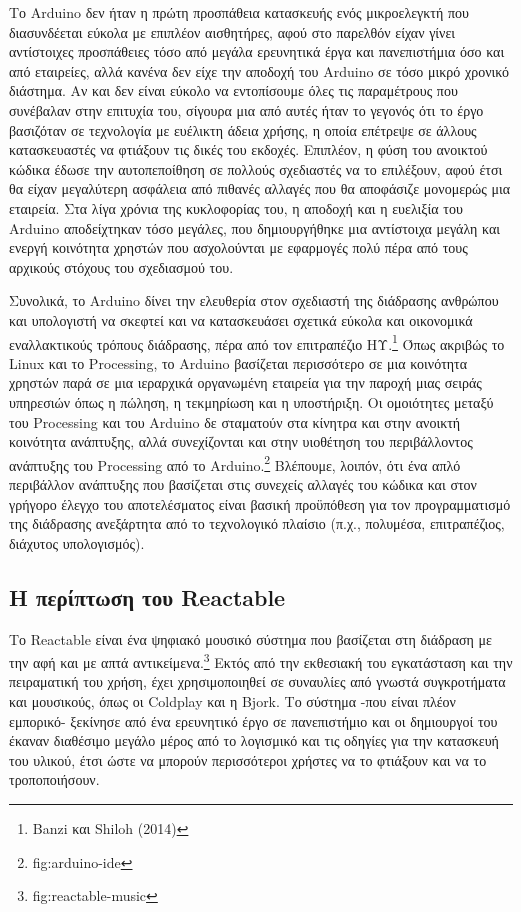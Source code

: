 \documentclass[
]{article}
\begin{document}
Το Arduino δεν ήταν η πρώτη προσπάθεια κατασκευής ενός μικροελεγκτή που
διασυνδέεται εύκολα με επιπλέον αισθητήρες, αφού στο παρελθόν είχαν
γίνει αντίστοιχες προσπάθειες τόσο από μεγάλα ερευνητικά έργα και
πανεπιστήμια όσο και από εταιρείες, αλλά κανένα δεν είχε την αποδοχή του
Arduino σε τόσο μικρό χρονικό διάστημα. Αν και δεν είναι εύκολο να
εντοπίσουμε όλες τις παραμέτρους που συνέβαλαν στην επιτυχία του,
σίγουρα μια από αυτές ήταν το γεγονός ότι το έργο βασιζόταν σε
τεχνολογία με ευέλικτη άδεια χρήσης, η οποία επέτρεψε σε άλλους
κατασκευαστές να φτιάξουν τις δικές του εκδοχές. Επιπλέον, η φύση του
ανοικτού κώδικα έδωσε την αυτοπεποίθηση σε πολλούς σχεδιαστές να το
επιλέξουν, αφού έτσι θα είχαν μεγαλύτερη ασφάλεια από πιθανές αλλαγές
που θα αποφάσιζε μονομερώς μια εταιρεία. Στα λίγα χρόνια της κυκλοφορίας
του, η αποδοχή και η ευελιξία του Arduino αποδείχτηκαν τόσο μεγάλες, που
δημιουργήθηκε μια αντίστοιχα μεγάλη και ενεργή κοινότητα χρηστών που
ασχολούνται με εφαρμογές πολύ πέρα από τους αρχικούς στόχους του
σχεδιασμού του.

Συνολικά, το Arduino δίνει την ελευθερία στον σχεδιαστή της διάδρασης
ανθρώπου και υπολογιστή να σκεφτεί και να κατασκευάσει σχετικά εύκολα
και οικονομικά εναλλακτικούς τρόπους διάδρασης, πέρα από τον επιτραπέζιο
ΗΥ.\footnote{Banzi και Shiloh (2014)} Όπως ακριβώς το Linux και το
Processing, το Arduino βασίζεται περισσότερο σε μια κοινότητα χρηστών
παρά σε μια ιεραρχικά οργανωμένη εταιρεία για την παροχή μιας σειράς
υπηρεσιών όπως η πώληση, η τεκμηρίωση και η υποστήριξη. Οι ομοιότητες
μεταξύ του Processing και του Arduino δε σταματούν στα κίνητρα και στην
ανοικτή κοινότητα ανάπτυξης, αλλά συνεχίζονται και στην υιοθέτηση του
περιβάλλοντος ανάπτυξης του Processing από το Arduino.\footnote{fig:arduino-ide}
Βλέπουμε, λοιπόν, ότι ένα απλό περιβάλλον ανάπτυξης που βασίζεται στις
συνεχείς αλλαγές του κώδικα και στον γρήγορο έλεγχο του αποτελέσματος
είναι βασική προϋπόθεση για τον προγραμματισμό της διάδρασης ανεξάρτητα
από το τεχνολογικό πλαίσιο (π.χ., πολυμέσα, επιτραπέζιος, διάχυτος
υπολογισμός).

\hypertarget{ux3b7-ux3c0ux3b5ux3c1ux3afux3c0ux3c4ux3c9ux3c3ux3b7-ux3c4ux3bfux3c5-reactable}{%
\subsection{Η περίπτωση του
Reactable}\label{ux3b7-ux3c0ux3b5ux3c1ux3afux3c0ux3c4ux3c9ux3c3ux3b7-ux3c4ux3bfux3c5-reactable}}

Το Reactable είναι ένα ψηφιακό μουσικό σύστημα που βασίζεται στη
διάδραση με την αφή και με απτά αντικείμενα.\footnote{fig:reactable-music}
Εκτός από την εκθεσιακή του εγκατάσταση και την πειραματική του χρήση,
έχει χρησιμοποιηθεί σε συναυλίες από γνωστά συγκροτήματα και μουσικούς,
όπως οι Coldplay και η Bjork. Το σύστημα -που είναι πλέον εμπορικό-
ξεκίνησε από ένα ερευνητικό έργο σε πανεπιστήμιο και οι δημιουργοί του
έκαναν διαθέσιμο μεγάλο μέρος από το λογισμικό και τις οδηγίες για την
κατασκευή του υλικού, έτσι ώστε να μπορούν περισσότεροι χρήστες να το
φτιάξουν και να το τροποποιήσουν.
\end{document}
